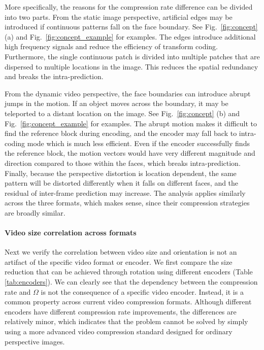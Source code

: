 \documentclass[journal,transmag]{IEEEtran}
\begin{document}
More specifically,
the reasons for the compression rate difference can be divided into two parts.
From the static image perspective,
artificial edges may be introduced if continuous patterns fall on the face boundary.
See Fig.~\ref{fig:concept} (a) and Fig.~\ref{fig:concept_example} for examples.
The edges introduce additional high frequency signals and reduce the efficiency of transform coding.
Furthermore,
the single continuous patch is divided into multiple patches that are dispersed to multiple locations in the image.
This reduces the spatial redundancy and breaks the intra-prediction.

From the dynamic video perspective,
the face boundaries can introduce abrupt jumps in the motion.
If an object moves across the boundary,
it may be teleported to a distant location on the image.
See Fig.~\ref{fig:concept} (b) and Fig.~\ref{fig:concept_example} for examples.
The abrupt motion makes it difficult to find the reference block during encoding,
and the encoder may fall back to intra-coding mode which is much less efficient.
Even if the encoder successfully finds the reference block,
the motion vectors would have very different magnitude and direction compared to those within the faces,
which breaks intra-prediction.
Finally,
because the perspective distortion is location dependent,
the same pattern will be distorted differently when it falls on different faces,
and the residual of inter-frame prediction may increase.
The analysis applies similarly across the three formats, which makes sense, since their compression strategies are broadly similar.

\paragraph{Video size correlation across formats}

Next we verify the correlation between video size and orientation is not an artifact of the specific video format or encoder.
We first compare the size reduction that can be achieved through rotation using different encoders (Table \ref{tab:encoders}).  
We can clearly see that the dependency between the compression rate and $\Omega$ is not the consequence of a specific video encoder.
Instead, it is a common property across current video compression formats.
Although different encoders have different compression rate improvements,
the differences are relatively minor,
which indicates that the problem cannot be solved by simply using a more advanced video compression standard designed for ordinary perspective images.
\end{document}
